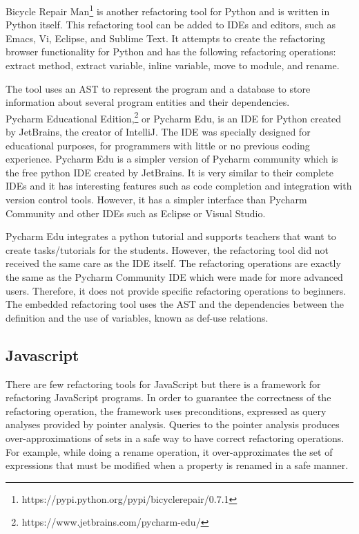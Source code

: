Bicycle Repair
Man\footnote{https://pypi.python.org/pypi/bicyclerepair/0.7.1} is
another refactoring tool for Python and is written in Python itself.  This
refactoring tool can be added to IDEs and editors, such as Emacs, Vi,
Eclipse, and Sublime Text.  It attempts to create the refactoring
browser functionality for Python and has the following refactoring
operations: extract method, extract variable, inline variable, move to
module, and rename.

The tool uses an AST to represent the program and a database to store
information about several program entities and their dependencies. \\


Pycharm Educational
Edition,\footnote{https://www.jetbrains.com/pycharm-edu/} or Pycharm
Edu, is an IDE for Python created by JetBrains, the creator of
IntelliJ.  The IDE was specially designed for educational purposes,
for programmers with little or no previous coding experience.  Pycharm
Edu is a simpler version of Pycharm community which is the free python
IDE created by JetBrains.  It is very similar to their complete IDEs
and it has interesting features such as code completion and
integration with version control tools.  However, it has a simpler
interface than Pycharm Community and other IDEs such as Eclipse or
Visual Studio. %

Pycharm Edu integrates a python tutorial and supports teachers that
want to create tasks/tutorials for the students.  However, the
refactoring tool did not received the same care as the IDE itself.
The refactoring operations are exactly the same as the Pycharm
Community IDE which were made for more advanced users.  Therefore, it
does not provide specific refactoring operations to beginners.  The
embedded refactoring tool uses the AST and the dependencies between
the definition and the use of variables, known as def-use relations.

\subsection{Javascript}

There are few refactoring tools for JavaScript but there is a
framework \cite{feldthaus2011tool} for refactoring JavaScript
programs. %
In order to guarantee the correctness of the refactoring operation,
the framework uses preconditions, expressed as query analyses provided
by pointer analysis. %
Queries to the pointer analysis produces over-approximations of sets
in a safe way to have correct refactoring operations.  For example,
while doing a rename operation, it over-approximates the set of
expressions that must be modified when a property is renamed in a safe
manner.

